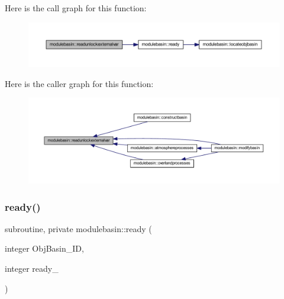 Here is the call graph for this function\+:\nopagebreak
\begin{figure}[H]
\begin{center}
\leavevmode
\includegraphics[width=350pt]{namespacemodulebasin_aff09c4da760fd9cda4b797242d7ff522_cgraph}
\end{center}
\end{figure}
Here is the caller graph for this function\+:\nopagebreak
\begin{figure}[H]
\begin{center}
\leavevmode
\includegraphics[width=350pt]{namespacemodulebasin_aff09c4da760fd9cda4b797242d7ff522_icgraph}
\end{center}
\end{figure}
\mbox{\label{namespacemodulebasin_afed1d3ff36b21d7528bddef4df954906}} 
\subsubsection{\texorpdfstring{ready()}{ready()}}
{\footnotesize\ttfamily subroutine, private modulebasin\+::ready (\begin{DoxyParamCaption}\item[{integer}]{Obj\+Basin\+\_\+\+ID,  }\item[{integer}]{ready\+\_\+ }\end{DoxyParamCaption})\hspace{0.3cm}{\ttfamily [private]}}

